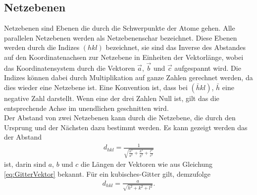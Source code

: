 \subsection{Netzebenen}
Netzebenen sind Ebenen die durch die Schwerpunkte der Atome gehen. Alle parallelen Netzebenen werden als Netzebenenschar bezeichnet. Diese Ebenen werden durch die Indizes $(hkl)$ bezeichnet, sie sind das Inverse des Abstandes auf den Koordinatenachsen zur Netzebene in Einheiten der Vektorlänge, wobei das Koordinatensystem durch die Vektoren $\vec{a}$, $\vec{b}$ und $\vec{c}$ aufgespannt wird. Die Indizes können dabei durch Multiplikation auf ganze Zahlen gerechnet werden, da dies wieder eine Netzebene ist. Eine Konvention ist, dass bei $(\bar{h}kl)$, $\bar{h}$ eine negative Zahl darstellt. Wenn eine der drei Zahlen Null ist, gilt das die entsprechende Achse im unendlichen geschnitten wird.\\
Der Abstand von zwei Netzebenen kann durch die Netzebene, die durch den Ursprung und der Nächsten dazu bestimmt werden. Es kann gezeigt werden das der Abstand 
\begin{align}
	d_{hkl}=\frac{1}{\sqrt{\frac{h^2}{a^2}+\frac{k^2}{b^2}+\frac{l^2}{c^2}}}
\end{align}
ist, darin sind $a$, $b$ und $c$ die Längen der Vektoren wie aus Gleichung \eqref{eq:GitterVektor} bekannt. Für ein kubisches-Gitter gilt, demzufolge 
\begin{align}
	d_{hkl}=\frac{a}{\sqrt{h^2+k^2+l^2}}.
	\label{eq:netzebenen_d}
\end{align}
